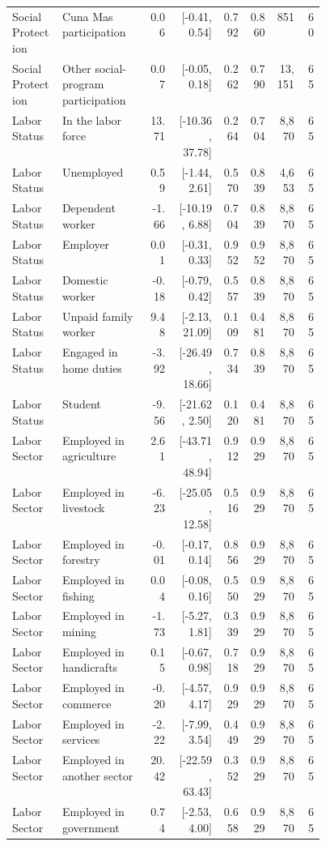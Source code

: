 \begin{longtable}{p{0.16\linewidth}p{0.29\linewidth}rrrrrr}
Social Protection & Cuna Mas participation & 0.06 & [-0.41, 0.54] & 0.792 & 0.860 & 851 & 60 \\
Social Protection & Other social-program participation & 0.07 & [-0.05, 0.18] & 0.262 & 0.790 & 13,151 & 65 \\
Labor Status & In the labor force & 13.71 & [-10.36, 37.78] & 0.264 & 0.704 & 8,870 & 65 \\
Labor Status & Unemployed & 0.59 & [-1.44, 2.61] & 0.570 & 0.839 & 4,653 & 65 \\
Labor Status & Dependent worker & -1.66 & [-10.19, 6.88] & 0.704 & 0.839 & 8,870 & 65 \\
Labor Status & Employer & 0.01 & [-0.31, 0.33] & 0.952 & 0.952 & 8,870 & 65 \\
Labor Status & Domestic worker & -0.18 & [-0.79, 0.42] & 0.557 & 0.839 & 8,870 & 65 \\
Labor Status & Unpaid family worker & 9.48 & [-2.13, 21.09] & 0.109 & 0.481 & 8,870 & 65 \\
Labor Status & Engaged in home duties & -3.92 & [-26.49, 18.66] & 0.734 & 0.839 & 8,870 & 65 \\
Labor Status & Student & -9.56 & [-21.62, 2.50] & 0.120 & 0.481 & 8,870 & 65 \\
Labor Sector & Employed in agriculture & 2.61 & [-43.71, 48.94] & 0.912 & 0.929 & 8,870 & 65 \\
Labor Sector & Employed in livestock & -6.23 & [-25.05, 12.58] & 0.516 & 0.929 & 8,870 & 65 \\
Labor Sector & Employed in forestry & -0.01 & [-0.17, 0.14] & 0.856 & 0.929 & 8,870 & 65 \\
Labor Sector & Employed in fishing & 0.04 & [-0.08, 0.16] & 0.550 & 0.929 & 8,870 & 65 \\
Labor Sector & Employed in mining & -1.73 & [-5.27, 1.81] & 0.339 & 0.929 & 8,870 & 65 \\
Labor Sector & Employed in handicrafts & 0.15 & [-0.67, 0.98] & 0.718 & 0.929 & 8,870 & 65 \\
Labor Sector & Employed in commerce & -0.20 & [-4.57, 4.17] & 0.929 & 0.929 & 8,870 & 65 \\
Labor Sector & Employed in services & -2.22 & [-7.99, 3.54] & 0.449 & 0.929 & 8,870 & 65 \\
Labor Sector & Employed in another sector & 20.42 & [-22.59, 63.43] & 0.352 & 0.929 & 8,870 & 65 \\
Labor Sector & Employed in government & 0.74 & [-2.53, 4.00] & 0.658 & 0.929 & 8,870 & 65 \\
\bottomrule
\end{longtable}
